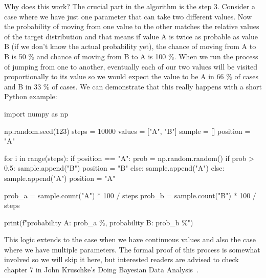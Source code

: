 \documentclass[12pt,a4paper,leqno]{report}
\theoremstyle{plain}
\theoremstyle{definition}
\theoremstyle{remark}
\begin{document}
Why does this work? The crucial part in the algorithm is the step 3. Consider a case
where we have just one parameter that can take two different values. Now the probability
of moving from one value to the other matches the relative values of the
target distribution and that means if value A is twice as probable as value B (if we don't know the
actual probability yet), the chance of moving from A to B is 50 \% and chance of moving
from B to A is 100 \%. When we run the process of jumping from one to another, eventually each of our two values
will be visited proportionally to its value so we would expect the value to be A in 66
\% of cases and B in 33 \% of cases. We can demonstrate that this really happens with a short Python
example:

\begin{pyblock}[][fontsize=\footnotesize]
import numpy as np

np.random.seed(123)
steps = 10000
values = ["A", "B"]
sample = []
position = "A"

for i in range(steps):
    if position == "A":
        prob = np.random.random()
        if prob > 0.5:
            sample.append("B")
            position = "B"
        else:
            sample.append("A")
    else:
        sample.append("A")
        position = "A"

prob_a = sample.count("A") * 100 / steps
prob_b = sample.count("B") * 100 / steps

print(f"probability A: {prob_a} \%, probability B: {prob_b} \%")
\end{pyblock}
\stdoutpythontex
\bigskip

This logic extends to the case when we have
continuous values and also the case where we have multiple parameters. The formal proof
of this process is somewhat involved so we will skip it here, but interested readers are
advised to check chapter 7 in John Kruschke's Doing Bayesian Data Analysis\ \cite{kruschke}.
\end{document}
